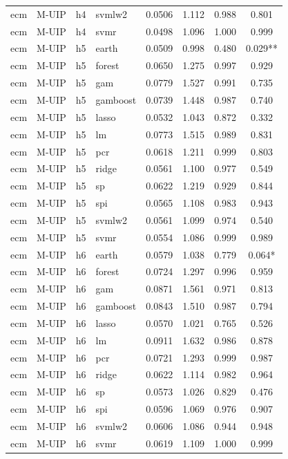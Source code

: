 \begin{ThreePartTable}
\begin{longtable}[t]{llclcccc}
ecm & M-UIP & h4 & svmlw2 & 0.0506 & 1.112 & 0.988 & 0.801\\
ecm & M-UIP & h4 & svmr & 0.0498 & 1.096 & 1.000 & 0.999\\
\addlinespace
ecm & M-UIP & h5 & earth & 0.0509 & 0.998 & 0.480 & 0.029**\\
ecm & M-UIP & h5 & forest & 0.0650 & 1.275 & 0.997 & 0.929\\
ecm & M-UIP & h5 & gam & 0.0779 & 1.527 & 0.991 & 0.735\\
ecm & M-UIP & h5 & gamboost & 0.0739 & 1.448 & 0.987 & 0.740\\
ecm & M-UIP & h5 & lasso & 0.0532 & 1.043 & 0.872 & 0.332\\
ecm & M-UIP & h5 & lm & 0.0773 & 1.515 & 0.989 & 0.831\\
ecm & M-UIP & h5 & pcr & 0.0618 & 1.211 & 0.999 & 0.803\\
ecm & M-UIP & h5 & ridge & 0.0561 & 1.100 & 0.977 & 0.549\\
ecm & M-UIP & h5 & sp & 0.0622 & 1.219 & 0.929 & 0.844\\
ecm & M-UIP & h5 & spi & 0.0565 & 1.108 & 0.983 & 0.943\\
ecm & M-UIP & h5 & svmlw2 & 0.0561 & 1.099 & 0.974 & 0.540\\
ecm & M-UIP & h5 & svmr & 0.0554 & 1.086 & 0.999 & 0.989\\
\addlinespace
ecm & M-UIP & h6 & earth & 0.0579 & 1.038 & 0.779 & 0.064*\\
ecm & M-UIP & h6 & forest & 0.0724 & 1.297 & 0.996 & 0.959\\
ecm & M-UIP & h6 & gam & 0.0871 & 1.561 & 0.971 & 0.813\\
ecm & M-UIP & h6 & gamboost & 0.0843 & 1.510 & 0.987 & 0.794\\
ecm & M-UIP & h6 & lasso & 0.0570 & 1.021 & 0.765 & 0.526\\
ecm & M-UIP & h6 & lm & 0.0911 & 1.632 & 0.986 & 0.878\\
ecm & M-UIP & h6 & pcr & 0.0721 & 1.293 & 0.999 & 0.987\\
ecm & M-UIP & h6 & ridge & 0.0622 & 1.114 & 0.982 & 0.964\\
ecm & M-UIP & h6 & sp & 0.0573 & 1.026 & 0.829 & 0.476\\
ecm & M-UIP & h6 & spi & 0.0596 & 1.069 & 0.976 & 0.907\\
ecm & M-UIP & h6 & svmlw2 & 0.0606 & 1.086 & 0.944 & 0.948\\
ecm & M-UIP & h6 & svmr & 0.0619 & 1.109 & 1.000 & 0.999\\

\end{longtable}
\end{ThreePartTable}

